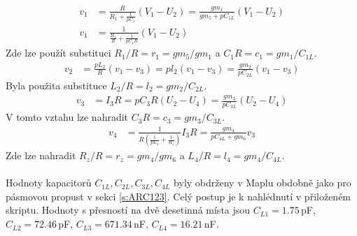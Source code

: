 \begin{align}
v_1 &= \frac{R}{R_1 + \frac{1}{pC_1}}(V_1 - U_2) = \frac{gm_1}{gm_5 + pC_{1L}}(V_1 - U_2)\\
v_1 &= \frac{1}{\frac{R_1}{R} + \frac{1}{pC_1R}}(V_1 - U_2)
\end{align}
Zde lze použít substituci $R_1/R = r_1 = gm_5/gm_1$ a $C_1R = c_1 = gm_1/C_{1L}$.
\begin{align}
v_2 &= \frac{pL_2}{R}(v_1 - v_3) = pl_2(v_1 - v_3) = \frac{gm_2}{pC_{2L}}(v_1 - v_3)
\end{align}
Byla použita substituce $L_2/R = l_2 = gm_2/C_{2L}$.
\begin{align}
v_3 &= I_3R = pC_3R(U_2 - U_4) = \frac{gm_3}{pC_{3L}}(U_2 - U_4)
\end{align}
V tomto vztahu lze nahradit $C_3R = c_3 = gm_3/C_{3L}$.
\begin{align}
v_4 &= \frac{1}{R(\frac{1}{pL_4} + \frac{1}{R_z})}I_3R = \frac{gm_4}{pC_{4L} + gm_6}v_3
\end{align}
Zde lze nahradit $R_z/R = r_z = gm_4/gm_6$ a $L_4/R = l_4 = gm_4/C_{4L}$.\\
\\
Hodnoty kapacitorů $C_{1L}, C_{2L}, C_{3L}, C_{4L}$ byly obdrženy v Maplu obdobně jako pro pásmovou propust v sekci \ref{s:ARC123}. Celý postup je k nahlédnutí v přiloženém skriptu. Hodnoty s přesností na dvě desetinná místa jsou $C_{L1} = 1.75$\,pF, $C_{L2} = 72.46$\,pF, $C_{L3} = 671.34$\,nF, $C_{L4} = 16.21$\,nF.
